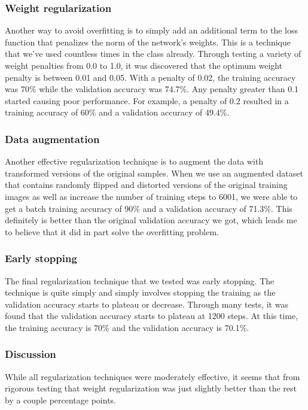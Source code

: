\documentclass{article}
\begin{document}
\subsubsection{Weight regularization}
Another way to avoid overfitting is to simply add an additional term to the loss function that penalizes the norm of the network's weights. This is a technique that we've used countless times in the class already. Through testing a variety of weight penalties from 0.0 to 1.0, it was discovered that the optimum weight penalty is between 0.01 and 0.05. With a penalty of 0.02, the training accuracy was 70\% while the validation accuracy was 74.7\%. Any penalty greater than 0.1 started causing poor performance. For example, a penalty of 0.2 resulted in a training accuracy of 60\% and a validation accuracy of 49.4\%. 

\subsubsection{Data augmentation}
Another effective regularization technique is to augment the data with transformed versions of the original samples. When we use an augmented dataset that contains randomly flipped and distorted versions of the original training images as well as increase the number of training steps to 6001, we were able to get a batch training accuracy of 90\% and a validation accuracy of 71.3\%. This definitely is better than the original validation accuracy we got, which leads me to believe that it did in part solve the overfitting problem. 

\subsubsection{Early stopping}
The final regularization technique that we tested was early stopping. The technique is quite simply and simply involves stopping the training as the validation accuracy starts to plateau or decrease. Through many tests, it was found that the validation accuracy starts to plateau at 1200 steps. At this time, the training accuracy is 70\% and the validation accuracy is 70.1\%. 

\subsubsection{Discussion}
While all regularization techniques were moderately effective, it seems that from rigorous testing that weight regularization was just slightly better than the rest by a couple percentage points.
\end{document}

